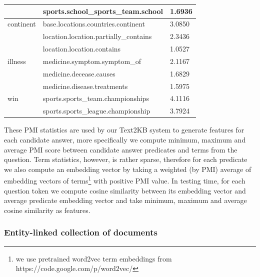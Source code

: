 \begin{table}
\begin{tabular}{| p{1.2cm} | p{5.0cm} | p{1.0cm} |}
& sports.school\_sports\_team.school & 1.6936 \\
\hline
continent & base.locations.countries.continent & 3.0850\\
& location.location.partially\_contains & 2.3436\\
& location.location.contains & 1.0527\\
\hline
illness & medicine.symptom.symptom\_of & 2.1167\\
& medicine.decease.causes & 1.6829\\
& medicine.disease.treatments & 1.5975\\
\hline
win & sports.sports\_team.championships & 4.1116\\
& sports.sports\_league.championship & 3.7924\\
\hline
\end{tabular}
\end{table}

These PMI statistics are used by our Text2KB system to generate features for each candidate answer, more specifically we compute minimum, maximum and average PMI score between candidate answer predicates and terms from the question.
Term statistics, however, is rather sparse, therefore for each predicate we also compute an embedding vector by taking a weighted (by PMI) average of embedding vectors of terms\footnote{we use pretrained word2vec term embeddings from https://code.google.com/p/word2vec/} with positive PMI value.
In testing time, for each question token we compute cosine similarity between its embedding vector and average predicate embedding vector and take minimum, maximum and average cosine similarity as features.

\subsubsection{Entity-linked collection of documents}
\label{section:method:clueweb}

